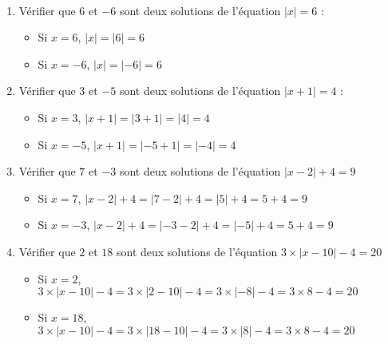 \documentclass[
	classe=$2^{de}$,
	exercices=Chapitre\space 1
]{exercice}
\begin{document}
\begin{exercice}\
	\begin{enumerate}
		\item Vérifier que $6$ et $-6$ sont deux solutions de l'équation $|x| = 6$ :
		      \ifdefined\makeCorrection
			      {\color{red}\begin{itemize}
					      \item Si $x = 6$, $|x| = |6| = 6$
					      \item Si $x = -6$, $|x| = |{-}6| = 6$
				      \end{itemize}}
		      \else
			      \vspace{3em}
		      \fi
		\item Vérifier que $3$ et $-5$ sont deux solutions de l'équation $|x + 1| = 4$ :
		      \ifdefined\makeCorrection
			      {\color{red}\begin{itemize}
					      \item Si $x = 3$, $|x + 1| = |3 + 1| = |4| = 4$
					      \item Si $x = {-}5$, $|x + 1| = |{-}5 + 1| = |{-}4| = 4$
				      \end{itemize}}
		      \else
			      \vspace{3em}
		      \fi
		\item Vérifier que $7$ et $-3$ sont deux solutions de l'équation $|x - 2| + 4 = 9$
		      \ifdefined\makeCorrection
			      {\color{red}\begin{itemize}
					      \item Si $x = 7$, $|x - 2| + 4 = |7 - 2| + 4 = |5| + 4 = 5 + 4 = 9$
					      \item Si $x = {-}3$, $|x - 2| + 4 = |{-}3 - 2| + 4 = |{-}5| + 4 = 5 + 4 = 9$
				      \end{itemize}}
		      \else
			      \vspace{3em}
		      \fi
		\item Vérifier que $2$ et $18$ sont deux solutions de l'équation $3 × |x - 10| - 4 = 20$
		      \ifdefined\makeCorrection
			      {\color{red}\begin{itemize}
					      \item Si $x = 2$, $3 × |x - 10| - 4 = 3 × |2 - 10| - 4 = 3 × |{-}8| - 4 = 3 × 8 - 4 = 20$
					      \item Si $x = 18$, $3 × |x - 10| - 4 = 3 × |18 - 10| - 4 = 3 × |8| - 4 = 3 × 8 - 4 = 20$
				      \end{itemize}}
		      \else
			      \vspace{3em}
		      \fi
	\end{enumerate}
\end{exercice}
\end{document}
